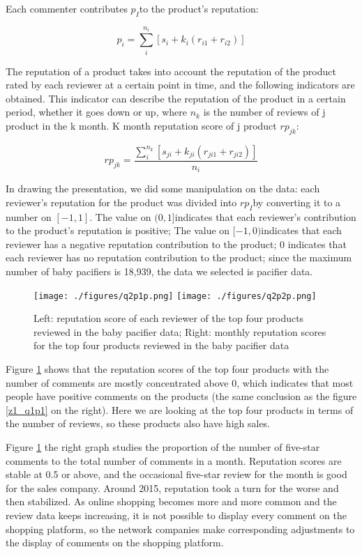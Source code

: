 \documentclass{mcmthesis}
\begin{document}
Each commenter contributes $p_{I}$to the product's reputation:

\begin{equation}\label{q2}
p_{i}=\sum_{i}^{n_i}[s_{i}+k_{i}(r_{i1}+r_{i2})]
\end{equation}

The reputation of a product takes into account the reputation of the product rated by each reviewer at a certain point in time, and the following indicators are obtained. This indicator can describe the reputation of the product in a certain period, whether it goes down or up, where $n_k$ is the number of reviews of j product in the k month. K month reputation score of j product $rp_{jk}$:

\begin{equation}\label{gs1}
rp_{jk}=\frac{\sum_{i}^{n_k}[s_{ji}+k_{ji}(r_{ji1}+r_{ji2})]}{n_i}
\end{equation}

In drawing the presentation, we did some manipulation on the data: each reviewer's reputation for the product was divided into $rp_{I}$by converting it to a number on $[-1,1]$. The value on $(0,1]$indicates that each reviewer's contribution to the product's reputation is positive; The value on $[-1,0)$indicates that each reviewer has a negative reputation contribution to the product; 0 indicates that each reviewer has no reputation contribution to the product; since the maximum number of baby pacifiers is 18,939, the data we selected is pacifier data.

\begin{figure}[h]
	\texttt{[image: ./figures/q2p1p.png]}
	\texttt{[image: ./figures/q2p2p.png]}
	\caption{Left: reputation score of each reviewer of the top four products reviewed in the baby pacifier data; Right: monthly reputation scores for the top four products reviewed in the baby pacifier data} \label{q2p1}
\end{figure}

Figure \ref{q2p1} shows that the reputation scores of the top four products with the number of comments are mostly concentrated above 0, which indicates that most people have positive comments on the products (the same conclusion as the figure \ref{z1_q1p1} on the right). Here we are looking at the top four products in terms of the number of reviews, so these products also have high sales.

Figure \ref{q2p1} the right graph studies the proportion of the number of five-star comments to the total number of comments in a month. Reputation scores are stable at 0.5 or above, and the occasional five-star review for the month is good for the sales company. Around 2015, reputation took a turn for the worse and then stabilized. As online shopping becomes more and more common and the review data keeps increasing, it is not possible to display every comment on the shopping platform, so the network companies make corresponding adjustments to the display of comments on the shopping platform.
\end{document}
